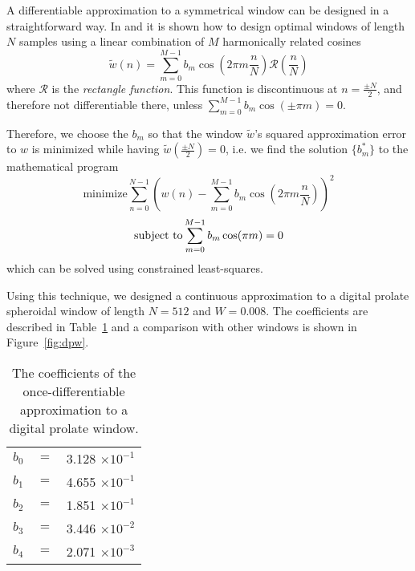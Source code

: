 \documentclass[plainsections,landscape]{sciposter}
\begin{document}
\begin{multicols}{3}
\begin{tcolorbox}
\begin{multicols}{2}
A differentiable approximation to a symmetrical window can be designed in a
straightforward way. In \cite{harris1978use} and \cite{rabiner1970approach} it
is shown how to design optimal windows of length $N$ samples using a linear
combination of $M$ harmonically related cosines
\begin{equation}
    \tilde{w}(n) = \sum_{m=0}^{M-1} b_{m} \cos (2 \pi m \frac{n}{N})
\mathcal{R}(\frac{n}{N})
\end{equation}
where $\mathcal{R}$ is the \textit{rectangle function}. This function is
discontinuous
at $n = \frac{\pm N}{2}$, and therefore not differentiable there, unless
$\sum_{m=0}^{M-1} b_{m} \cos ( \pm \pi m ) = 0$.

Therefore, we choose the $b_{m}$ so that
the window $\tilde{w}$'s squared approximation error to $w$ is minimized while having
$\tilde{w}(\frac{\pm N}{2}) = 0$, i.e. we find the solution $\{ b^{\ast}_{m} \}$ to the
mathematical program
\begin{equation}
    \label{eq:searchcontwinprogram}
    \text{minimize}
    \sum_{n=0}^{N-1} ( w(n) 
        - \sum_{m=0}^{M-1} b_{m} \cos(2 \pi m \frac{n}{N}))^{2}
\end{equation}
\begin{equation}
    \text{subject to} \\
    \sum_{m=0}^{M-1} b_{m} \cos(\pi m ) = 0
\end{equation}
which can be solved using constrained least-squares\cite[p.~585]{golub1996matrix}.
\end{multicols}
\end{tcolorbox}

\begin{tcolorbox}
\begin{multicols}{2}
Using this technique, we designed a continuous approximation to a digital prolate
spheroidal window of length $N=512$ and $W=0.008$. The coefficients
are described in Table~\ref{tab:contprolate} and a comparison with other
windows is shown in Figure~\ref{fig:dpw}.

\begin{table}[]
    \caption{The coefficients of the once-differentiable approximation to a digital prolate
    window.
    \label{tab:contprolate}}
    \begin{center}
        \begin{tabular}{c c c}
            $b_0$ & $ = $ & 3.128 $\times 10^{-1}$ \\
            $b_1$ & $ = $ & 4.655 $\times 10^{-1}$ \\
            $b_2$ & $ = $ & 1.851 $\times 10^{-1}$ \\
            $b_3$ & $ = $ & 3.446 $\times 10^{-2}$ \\
            $b_4$ & $ = $ & 2.071 $\times 10^{-3}$ 
        \end{tabular}
    \end{center}
\end{table}%
\end{multicols}
\end{tcolorbox}


\end{multicols}
\end{document}
